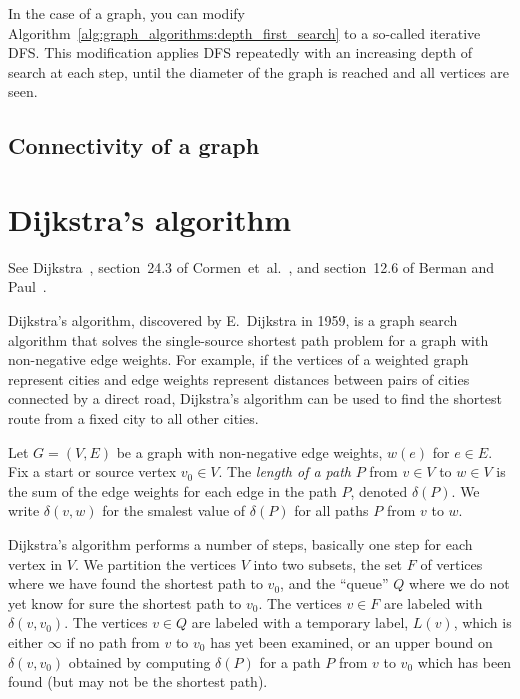 In the case of a graph, you can modify
Algorithm~\ref{alg:graph_algorithms:depth_first_search} to a so-called
iterative DFS. This modification applies DFS repeatedly with an
increasing depth of search at each step, until the diameter of the
graph is reached and all vertices are seen.

\subsection{Connectivity of a graph}




\section{Dijkstra's algorithm}

See Dijkstra~\cite{Dijkstra1959}, section~24.3 of
Cormen~et~al.~\cite{CormenEtAl2001}, and section~12.6 of Berman and
Paul~\cite{BermanPaul1997}.

Dijkstra's algorithm, discovered by E.~Dijkstra in 1959, is a graph
search algorithm that solves the single-source shortest path problem
for a graph with non-negative edge weights. For example, if the
vertices of a weighted graph represent cities and edge weights
represent distances between pairs of cities connected by a direct
road, Dijkstra's algorithm can be used to find the shortest route from
a fixed city to all other cities.


 Let $G=(V,E)$ be a graph with non-negative edge weights,
$w(e)$ for $e\in E$. Fix a start or source vertex $v_0\in V$.
The {\it length of a path} $P$ from $v\in V$ to $w\in V$ is
the sum of the edge weights for each edge in the path $P$,
denoted $\delta (P)$. We write $\delta(v,w)$ for the smalest value of
$\delta(P)$ for all paths $P$ from $v$ to $w$.

Dijkstra's algorithm performs a number of steps, basically
one step for each vertex in $V$. We partition the vertices $V$ into
two subsets, the set $F$ of vertices where we have found the
shortest path to $v_0$, and the ``queue'' $Q$ where we do not
yet know for sure the shortest path to $v_0$.
The vertices $v\in F$ are labeled with $\delta(v,v_0)$.
The vertices $v\in Q$ are labeled with a temporary label,
$L(v)$, which is either $\infty$ if no path from $v$ to $v_0$ has
yet been examined, or an upper bound on $\delta(v,v_0)$
obtained by computing $\delta(P)$ for a path $P$ from
$v$ to $v_0$ which has been found (but may not be
the shortest path).


